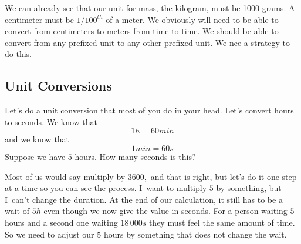 \documentclass[]{Book}
\begin{document}
We can already see that our unit for mass, the kilogram, must be 1000 grams.
A centimeter must be $1/100^{th}$ of a meter. We obviously will need to be
able to convert from centimeters to meters from time to time. We should be
able to convert from any prefixed unit to any other prefixed unit. We nee a
strategy to do this.

\subsection{Unit Conversions}

Let's do a unit conversion that most of you do in your head. Let's convert
hours to seconds. We know that 
\begin{equation*}
	1\unit{h}=60\unit{min}
\end{equation*}%
and we know that 
\begin{equation*}
	1\unit{min}=60\unit{s}
\end{equation*}%
Suppose we have $5$ hours. How many seconds is this?

Most of us would say multiply by $3600,$ and that is right, but let's do it
one step at a time so you can see the process. I\ want to multiply $5$ by
something, but I\ can't change the duration. At the end of our calculation,
it still has to be a wait of $5\unit{h}$ even though we now give the value
in seconds. For a person waiting $5$ hours and a second one waiting $%
\allowbreak 18\,000\unit{s}$ they must feel the same amount of time. So we
need to adjust our $5$ hours by something that does not change the wait.
\end{document}
